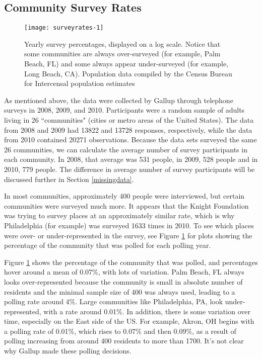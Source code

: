 \documentclass[smallextended]{svjour3}\usepackage[]{graphicx}\usepackage[]{color}
\newenvironment{knitrout}{}{} %
\begin{document}
\subsection{Community Survey Rates}
\label{maprates}



\begin{knitrout}
\color{fgcolor}\begin{figure}

\texttt{[image: surveyrates-1]} \hfill{}

\caption[Yearly survey percentages, displayed on a log scale]{Yearly survey percentages, displayed on a log scale. Notice that some communities are always over-surveyed (for example, Palm Beach, FL) and some always appear under-surveyed (for example, Long Beach, CA). Population data compiled by the Census Bureau for Intercensal population estimates}\label{fig:surveyrates}
\end{figure}


\end{knitrout}
As mentioned above, the data were collected by Gallup through telephone surveys in 2008, 2009, and 2010. Participants were a random sample of adults living in 26 ``communities" (cities or metro areas of the United States). The data from 2008 and 2009 had 13822 and 13728 responses, respectively, while the data from 2010 contained 20271 observations. Because the data sets surveyed the same 26 communities, we can calculate the average number of survey participants in each community. In 2008, that average was 531 people, in 2009, 528 people and in 2010, 779 people. The difference in average number of survey participants will be discussed further in Section \ref{missingdata}. 

In most communities, approximately 400 people were interviewed, but certain communities were surveyed much more. It appears that the Knight Foundation was trying to survey places at an approximately similar rate, which is why Philadelphia (for example) was surveyed 1633 times in 2010. To see which places were over- or under-represented in the survey, see Figure \ref{fig:surveyrates} for plots showing the percentage of the community that was polled for each polling year.

Figure \ref{fig:surveyrates} shows the percentage of the community that was polled, and percentages hover around a mean of 0.07\%, with lots of variation. Palm Beach, FL always looks over-represented because the community is small in absolute number of residents and the minimal sample size of 400 was always used, leading to a polling rate around 4\%. Large communities like Philadelphia, PA, look under-represented, with a rate around 0.01\%. In addition, there is some variation over time, especially on the East side of the US. For example, Akron, OH begins with a polling rate of 0.01\%, which rises to 0.07\% and then 0.09\%, as a result of polling increasing from around 400 residents to more than 1700. It's not clear why Gallup made these polling decisions. 
\end{document}
